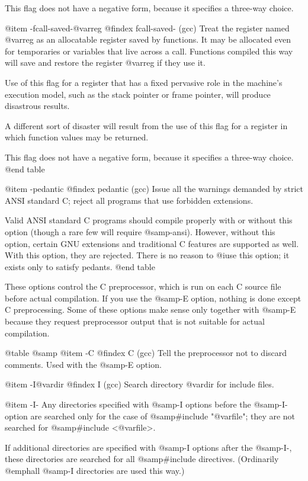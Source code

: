 {This flag does not have a negative form, because it specifies a
three-way choice.

@item -fcall-saved-@var{reg}
@findex fcall-saved- (gcc)
Treat the register named @var{reg} as an allocatable register
saved by functions. It may be allocated even for temporaries or
variables that live across a call. Functions compiled this way
will save and restore the register @var{reg} if they use it.

Use of this flag for a register that has a fixed pervasive role
in the machine's execution model, such as the stack pointer or
frame pointer, will produce disastrous results.

A different sort of disaster will result from the use of this
flag for a register in which function values may be returned.

This flag does not have a negative form, because it specifies a
three-way choice.
@end table

@item -pedantic
@findex pedantic (gcc)
Issue all the warnings demanded by strict ANSI standard C; reject
all programs that use forbidden extensions.

Valid ANSI standard C programs should compile properly with or without
this option (though a rare few will require @samp{-ansi}). However,
without this option, certain GNU extensions and traditional C features
are supported as well. With this option, they are rejected. There is
no reason to @i{use} this option; it exists only to satisfy pedants.
@end table

These options control the C preprocessor, which is run on each C source
file before actual compilation. If you use the @samp{-E} option, nothing
is done except C preprocessing. Some of these options make sense only
together with @samp{-E} because they request preprocessor output that is
not suitable for actual compilation.

@table @samp
@item -C
@findex C (gcc)
Tell the preprocessor not to discard comments. Used with the
@samp{-E} option.

@item -I@var{dir}
@findex I (gcc)
Search directory @var{dir} for include files.

@item -I-
Any directories specified with @samp{-I} options before the @samp{-I-}
option are searched only for the case of @samp{#include "@var{file}"};
they are not searched for @samp{#include <@var{file}>}.

If additional directories are specified with @samp{-I} options after
the @samp{-I-}, these directories are searched for all @samp{#include}
directives. (Ordinarily @emph{all} @samp{-I} directories are used
this way.)

}
